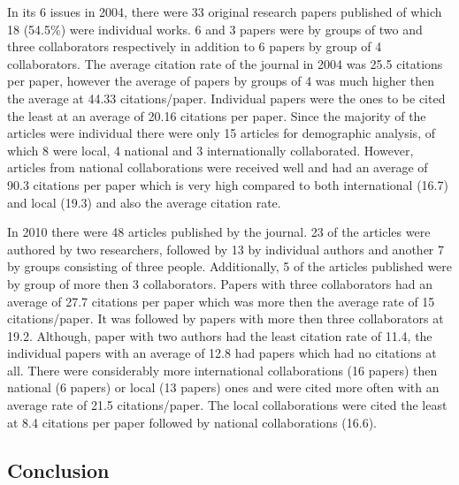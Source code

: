\documentclass[12pt]{article}
\begin{document}
In its 6 issues in 2004, there were 33 original research papers published of which 18 (54.5\%) were individual works. 6 and 3 papers were by groups of two and three collaborators respectively in addition to 6 papers by group of 4 collaborators. The average citation rate of the journal in 2004 was 25.5 citations per paper, however the average of papers by groups of 4 was much higher then the average at 44.33 citations/paper. Individual papers were the ones to be cited the least at an average of 20.16 citations per paper. Since the majority of the articles were individual there were only 15 articles for demographic analysis, of which 8 were local, 4 national and 3 internationally collaborated. However, articles from national collaborations were received well and had an average of 90.3 citations per paper which is very high compared to both international (16.7) and local (19.3) and also the average citation rate.

In 2010 there were 48 articles published by the journal. 23 of the articles were authored by two researchers, followed by 13 by individual authors and another 7 by groups consisting of three people. Additionally, 5 of the articles published were by group of more then 3 collaborators. Papers with three collaborators had an average of 27.7 citations per paper which was more then the average rate of 15 citations/paper. It was followed by papers with more then three collaborators at 19.2. Although, paper with two authors had the least citation rate of 11.4, the individual papers with an average of 12.8 had papers which had no citations at all. There were considerably more international collaborations (16 papers) then national (6 papers) or local (13 papers) ones and were cited more often with an average rate of 21.5 citations/paper. The local collaborations were cited the least at 8.4 citations per paper followed by national collaborations (16.6).


\subsection{Conclusion}
\end{document}
